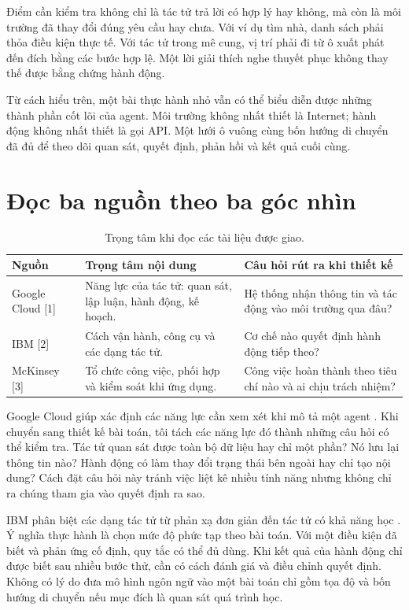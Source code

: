 Điểm cần kiểm tra không chỉ là tác tử trả lời có hợp lý hay không, mà còn là môi trường đã thay đổi đúng yêu cầu hay chưa. Với ví dụ tìm nhà, danh sách phải thỏa điều kiện thực tế. Với tác tử trong mê cung, vị trí phải đi từ ô xuất phát đến đích bằng các bước hợp lệ. Một lời giải thích nghe thuyết phục không thay thế được bằng chứng hành động.

Từ cách hiểu trên, một bài thực hành nhỏ vẫn có thể biểu diễn được những thành phần cốt lõi của agent. Môi trường không nhất thiết là Internet; hành động không nhất thiết là gọi API. Một lưới ô vuông cùng bốn hướng di chuyển đã đủ để theo dõi quan sát, quyết định, phản hồi và kết quả cuối cùng.

\clearpage
\section{Đọc ba nguồn theo ba góc nhìn}
\begin{table}[H]\centering\small
\caption{Trọng tâm khi đọc các tài liệu được giao.}
\begin{tabularx}{\textwidth}{@{}p{2.6cm}Y Y@{}}\toprule
Nguồn & Trọng tâm nội dung & Câu hỏi rút ra khi thiết kế \\\midrule
Google Cloud [1] & Năng lực của tác tử: quan sát, lập luận, hành động, kế hoạch. & Hệ thống nhận thông tin và tác động vào môi trường qua đâu? \\
IBM [2] & Cách vận hành, công cụ và các dạng tác tử. & Cơ chế nào quyết định hành động tiếp theo? \\
McKinsey [3] & Tổ chức công việc, phối hợp và kiểm soát khi ứng dụng. & Công việc hoàn thành theo tiêu chí nào và ai chịu trách nhiệm? \\\bottomrule
\end{tabularx}
\end{table}

Google Cloud giúp xác định các năng lực cần xem xét khi mô tả một agent \cite{google}. Khi chuyển sang thiết kế bài toán, tôi tách các năng lực đó thành những câu hỏi có thể kiểm tra. Tác tử quan sát được toàn bộ dữ liệu hay chỉ một phần? Nó lưu lại thông tin nào? Hành động có làm thay đổi trạng thái bên ngoài hay chỉ tạo nội dung? Cách đặt câu hỏi này tránh việc liệt kê nhiều tính năng nhưng không chỉ ra chúng tham gia vào quyết định ra sao.

IBM phân biệt các dạng tác tử từ phản xạ đơn giản đến tác tử có khả năng học \cite{ibm}. Ý nghĩa thực hành là chọn mức độ phức tạp theo bài toán. Với một điều kiện đã biết và phản ứng cố định, quy tắc có thể đủ dùng. Khi kết quả của hành động chỉ được biết sau nhiều bước thử, cần có cách đánh giá và điều chỉnh quyết định. Không có lý do đưa mô hình ngôn ngữ vào một bài toán chỉ gồm tọa độ và bốn hướng di chuyển nếu mục đích là quan sát quá trình học.

